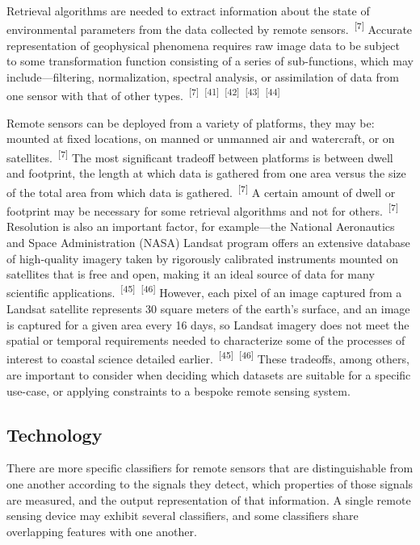 \documentclass{article}
\begin{document}
\par{Retrieval algorithms are needed to extract information about the state of environmental parameters from the data collected by remote sensors.~\textsuperscript{[7]} Accurate representation of geophysical phenomena requires raw image data to be subject to some transformation function consisting of a series of sub-functions, which may include---filtering, normalization, spectral analysis, or assimilation of data from one sensor with that of other types.~\textsuperscript{[7]}~\textsuperscript{[41]}~\textsuperscript{[42]}~\textsuperscript{[43]}~\textsuperscript{[44]}}

\par{Remote sensors can be deployed from a variety of platforms, they may be: mounted at fixed locations, on manned or unmanned air and watercraft, or on satellites.~\textsuperscript{[7]} The most significant tradeoff between platforms is between dwell and footprint, the length at which data is gathered from one area versus the size of the total area from which data is gathered.~\textsuperscript{[7]} A certain amount of dwell or footprint may be necessary for some retrieval algorithms and not for others.~\textsuperscript{[7]} Resolution is also an important factor, for example---the National Aeronautics and Space Administration (NASA) Landsat program offers an extensive database of high-quality imagery taken by rigorously calibrated instruments mounted on satellites that is free and open, making it an ideal source of data for many scientific applications.~\textsuperscript{[45]}~\textsuperscript{[46]} However, each pixel of an image captured from a Landsat satellite represents 30 square meters of the earth's surface, and an image is captured for a given area every 16 days, so Landsat imagery does not meet the spatial or temporal requirements needed to characterize some of the processes of interest to coastal science detailed earlier.~\textsuperscript{[45]}~\textsuperscript{[46]} These tradeoffs, among others, are important to consider when deciding which datasets are suitable for a specific use-case, or applying constraints to a bespoke remote sensing system.}

\subsection{Technology}

\par{There are more specific classifiers for remote sensors that are distinguishable from one another according to the signals they detect, which properties of those signals are measured, and the output representation of that information. A single remote sensing device may exhibit several classifiers, and some classifiers share overlapping features with one another.}
\end{document}
